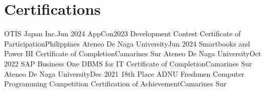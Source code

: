 \section{Certifications}
\resumeSubHeadingListStart
    \resumeSubheading
    {OTIS Japan Inc.}{Jun 2024}
    {AppCon2023 Development Contest Certificate of Participation}{Philippines}
    \resumeSubheading
    {Ateneo De Naga University}{Jun 2024}
    {Smartbooks and Power BI Certificate of Completion}{Camarines Sur}
    \resumeSubheading
    {Ateneo De Naga University}{Oct 2022}
    {SAP Business One DBMS for IT Certificate of Completion}{Camarines Sur}
    \resumeSubheading
    {Ateneo De Naga University}{Dec 2021}
    {18th Place ADNU Freshmen Computer Programming Competition Certification of Achievement}{Camarines Sur}
\resumeSubHeadingListEnd